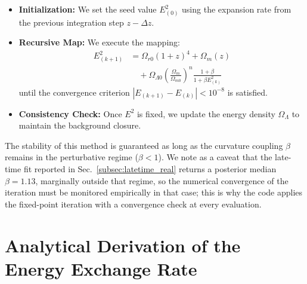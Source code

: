 \documentclass[pdflatex,sn-mathphys-num]{sn-jnl}%
\begin{document}
\begin{itemize}
    \item \textbf{Initialization:} We set the seed value $E_{(0)}^2$ using the expansion rate from the previous integration step $z - \Delta z$.
    \item \textbf{Recursive Map:} We execute the mapping:
    \begin{equation}
        \begin{aligned}
        E_{(k+1)}^2 &= \Omega_{r0}(1+z)^4 + \Omega_m(z) \\
        &\quad + \Omega_{\Lambda0}\left(\frac{\Omega_m}{\Omega_{m0}}\right)^n
        \frac{1+\beta}{1+\beta E_{(k)}^2}
        \end{aligned}
    \end{equation}
    until the convergence criterion $|E_{(k+1)} - E_{(k)}| < 10^{-8}$ is satisfied.
    \item \textbf{Consistency Check:} Once $E^2$ is fixed, we update the energy density $\Omega_\Lambda$ to maintain the background closure.
\end{itemize}

The stability of this method is guaranteed as long as the curvature coupling
$\beta$ remains in the perturbative regime ($\beta < 1$). We note as a caveat
that the late-time fit reported in Sec.~\ref{subsec:latetime_real} returns a
posterior median $\beta=1.13$, marginally outside that regime, so the numerical
convergence of the iteration must be monitored empirically in that case; this is
why the code applies the fixed-point iteration with a convergence check at every
evaluation.

\section{Analytical Derivation of the Energy Exchange Rate}
\label{app:exact_Q}
\end{document}
